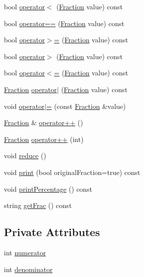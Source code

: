 \begin{DoxyCompactItemize}
bool \hyperlink{class_fraction_a7a122e21981f269280383178adce2868}{operator$<$} (\hyperlink{class_fraction}{Fraction} value) const
\item 
bool \hyperlink{class_fraction_ac652d0394b5c8f0046a975bf7ea1b60b}{operator==} (\hyperlink{class_fraction}{Fraction} value) const
\item 
bool \hyperlink{class_fraction_a2fc5da88a8106c34bd15a472c58cd61c}{operator$>$=} (\hyperlink{class_fraction}{Fraction} value) const
\item 
bool \hyperlink{class_fraction_a110a04c675b4737f09e6b84236f3d8e6}{operator$>$} (\hyperlink{class_fraction}{Fraction} value) const
\item 
bool \hyperlink{class_fraction_aa1a199c08a893bfb787a5b5a9915ba8b}{operator$<$=} (\hyperlink{class_fraction}{Fraction} value) const
\item 
\hyperlink{class_fraction}{Fraction} \hyperlink{class_fraction_a41a3516a3b2d8c431ea8a17a033f48a9}{operator$\vert$} (\hyperlink{class_fraction}{Fraction} value) const
\item 
void \hyperlink{class_fraction_a13da35dc2c6c3bee73c749192a61df8a}{operator$\vert$=} (const \hyperlink{class_fraction}{Fraction} \&value)
\item 
\hyperlink{class_fraction}{Fraction} \& \hyperlink{class_fraction_ac8ae2e81294340889183951be2657633}{operator++} ()
\item 
\hyperlink{class_fraction}{Fraction} \hyperlink{class_fraction_a8fc2c460f8cf333d153da2f53a969edf}{operator++} (int)
\item 
void \hyperlink{class_fraction_a8eee4d9ddb8a3484930f7fa5f7ca3ae7}{reduce} ()
\item 
void \hyperlink{class_fraction_a053300eed15ed1783a4316f9b7bf8a4f}{print} (bool original\+Fraction=true) const
\item 
void \hyperlink{class_fraction_a08ffc86159f5b96b10df4bfdf2f5c0a5}{print\+Percentage} () const
\item 
string \hyperlink{class_fraction_af475a2e5500fd3a0c36d918a2950464c}{get\+Frac} () const
\end{DoxyCompactItemize}
\subsection*{Private Attributes}
\begin{DoxyCompactItemize}
\item 
int \hyperlink{class_fraction_a447e179720bd927a19c1d73fb040d1c4}{numerator}
\item 
int \hyperlink{class_fraction_a079acff7892d39be395f14799244d044}{denominator}
\end{DoxyCompactItemize}


